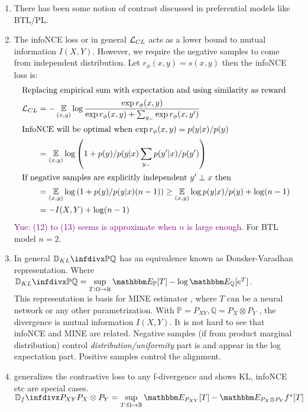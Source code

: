 \documentclass{article}
\newcommand{\yue}[1]{\textcolor{purple}{Yue: #1}}
\begin{document}
\begin{enumerate}
    \item There has been some notion of contrast discussed in preferential models like BTL/PL. \cite{Brookes2023ContrastiveEpistasis,Chen2018ContrastiveMeasurements}  
    \item The infoNCE loss \citep{vandenOordDeepMind2018RepresentationCoding} or in general $\mathcal{L}_{CL}$ acts as a lower bound to mutual information $I(X,Y)$. However, we require the negative samples to come from independent distribution. Let $r_\phi(x,y)=s(x,y)$ then the infoNCE loss is:
    \begin{align}
    \intertext{Replacing empirical sum with expectation and using similarity as reward}
        \mathcal{L}_{CL}&=-\operatorname*{\mathbb{E}}\limits_{(x,y)}\log \frac{\exp r_\phi(x,y)}{\exp r_\phi(x,y)+\sum_{y_{-}}\exp r_\phi(x,y')}\\
        \intertext{InfoNCE will be optimal when $\exp r_\phi(x,y)=p(y|x)/p(y)$}
        &=\operatorname*{\mathbb{E}}\limits_{(x,y)}\log \left(1+p(y)/p(y|x)\sum_{y_{-}}p(y'|x)/p(y')\right)\\
        \intertext{If negative samples are explicitly independent $y'\perp x$ then}
        &=\operatorname*{\mathbb{E}}\limits_{(x,y)}\log \left(1+p(y)/p(y|x)(n-1)\right)\geq \operatorname*{\mathbb{E}}\limits_{(x,y)}\log p(y|x)/p(y)+\log(n-1)\\
        &= -I(X,Y)+\log(n-1)
    \end{align}
    \yue{(12) to (13) seems is approximate when $n$ is large enough.}
    For BTL model $n=2$.
    \item In general $\infdiv{\mathbb{P}}{\mathbb{Q}}$ has an equivalence known as Donsker-Varadhan representation. Where $\infdiv{\mathbb{P}}{\mathbb{Q}}=\sup\limits_{T:\Omega\to\reals}\bE_\mathbb{P}[T]-\log \bE_\mathbb{Q}[e^T]$. \\
    This representation is basis for MINE estimator \citep{Belghazi2018MINE:Estimation}, where $T$ can be a neural network or any other parametrization. With $\mathbb{P}=P_{XY},\mathbb{Q}=P_X\otimes P_Y$ , the divergence is mutual information $I(X,Y)$. It is not hard to see that infoNCE and MINE are related. Negative samples (if from product marginal distribution) control \emph{distribution/uniformity} part is and appear in the log expectation part. Positive samples control the alignment.
    \item \cite{Lu2024f-MICL:Learning} generalizes the contrastive loss to any f-divergence and shows KL, infoNCE etc are special cases.  $\fdiv{P_{XY}}{P_X\otimes P_Y}=\sup\limits_{T:\Omega\to\reals}\bE_{P_{XY}}[T]-\bE_{P_X\otimes P_Y}f^*[T]$

\end{enumerate}
\end{document}
